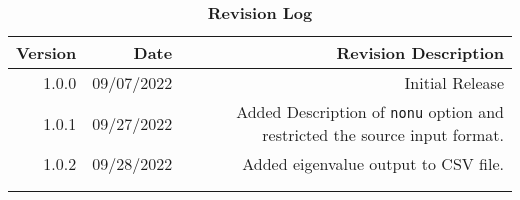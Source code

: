 \begin{titlepage}

   \BgThispage
   \thispagestyle{firststyle}

   \vspace*{\fill}

   \begin{minipage}[l][][c]{0.6\textwidth}
   \end{minipage}

   \vspace*{\fill}

\vspace{1cm}


   \end{titlepage}

   \pagestyle{fancy}

   \vspace*{\fill}

   \captionsetup{justification=centering}
   \begin{table}[H]
   \centering
   \caption*{\Large\bfseries{Revision Log}}
   \begin{tabular}{rrr}
   \toprule
   \textbf{Version} & \textbf{Date}& \textbf{Revision Description} \\
   \midrule
   1.0.0 & 09/07/2022 & Initial Release \\
   1.0.1 & 09/27/2022 & Added Description of \verb"nonu" option and restricted the source input format. \\
   1.0.2 & 09/28/2022 & Added eigenvalue output to CSV file. \\
   & & \\
   & & \\
   \bottomrule
   \end{tabular}
   \end{table}

   \vspace*{\fill}

   \captionsetup{justification=justified}

   \vspace*{\fill}